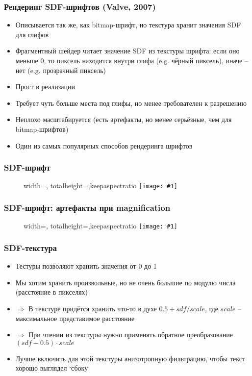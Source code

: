 \documentclass{beamer}
\newcommand{\slideimage}[1]{
  \begin{figure}
    \begin{adjustbox}{width=\textwidth, totalheight=\textheight-2\baselineskip-2\baselineskip,keepaspectratio}
      \texttt{[image: \#1]}
    \end{adjustbox}
  \end{figure}
}
\begin{document}
\begin{frame}[fragile]
\frametitle{Рендеринг SDF-шрифтов (Valve, 2007)}
\begin{itemize}
\item Описывается так же, как bitmap-шрифт, но текстура хранит значения SDF для глифов
\pause
\item Фрагментный шейдер читает значение SDF из текстуры шрифта: если оно меньше 0, то пиксель находится внутри глифа (e.g. чёрный пиксель), иначе -- нет (e.g. прозрачный пиксель)
\pause
\item Прост в реализации
\pause
\item Требует чуть больше места под глифы, но менее требователен к разрешению
\pause
\item Неплохо масштабируется (есть артефакты, но менее серьёзные, чем для bitmap-шрифтов)
\pause
\item Один из самых популярных способов рендеринга шрифтов
\end{itemize}
\end{frame}

\begin{frame}[fragile]
\frametitle{SDF-шрифт}
\slideimage{sdf-font.png}
\end{frame}

\begin{frame}[fragile]
\frametitle{SDF-шрифт: артефакты при magnification}
\slideimage{sdf-artifacts.jpg}
\end{frame}

\begin{frame}[fragile]
\frametitle{SDF-текстура}
\begin{itemize}
\item Тестуры позволяют хранить значения от 0 до 1
\pause
\item Мы хотим хранить произвольные, но не очень большие по модулю числа (расстояние в пикселях)
\pause
\item \begin{math}\Longrightarrow\end{math} В текстуре придётся хранить что-то в духе \begin{math}0.5 + sdf / scale\end{math}, где \begin{math}scale\end{math} -- максимальное представимое расстояние
\pause
\item \begin{math}\Longrightarrow\end{math} При чтении из текстуры нужно применять обратное преобразование \begin{math}(sdf - 0.5) \cdot scale\end{math}
\pause
\item Лучше включить для этой текстуры анизотропную фильтрацию, чтобы текст хорошо выглядел `сбоку'
\end{itemize}
\end{frame}
\end{document}
